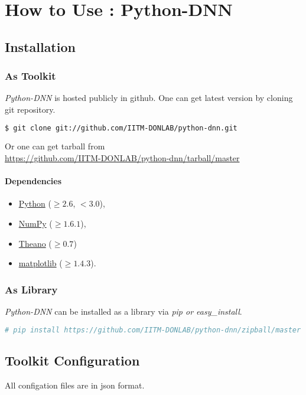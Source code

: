 \appendix
\label{app:pythondnn}
\chapter{How to Use : Python-DNN}
\section{Installation}
\subsection{As Toolkit}

\noindent \textit{Python-DNN} is hosted publicly in github. One can get latest version by cloning git repository.
\begin{lstlisting}[language=bash,basicstyle=\small] 
$ git clone git://github.com/IITM-DONLAB/python-dnn.git
\end{lstlisting}
Or one can get tarball from \\
\url{https://github.com/IITM-DONLAB/python-dnn/tarball/master}

\subsubsection{Dependencies}
\begin{itemize}
	\item \href{https://www.python.org/downloads/}{Python} ($\geq2.6$, $< 3.0$),
	\item \href{http://www.numpy.org/}{NumPy} ($\geq 1.6.1$),
	\item \href{http://www.deeplearning.net/software/theano/install.html#install}{Theano} ($\geq 0.7$)
	\item \href{http://matplotlib.org/}{matplotlib} ($\geq 1.4.3$).
\end{itemize}

\subsection{As Library}
\textit{Python-DNN} can be installed as a library via 
\textit{pip or easy\_install}.
\begin{lstlisting}[language=bash,basicstyle=\small] 
# pip install https://github.com/IITM-DONLAB/python-dnn/zipball/master
\end{lstlisting}

\section{Toolkit Configuration} 
All configation files are in json format.
